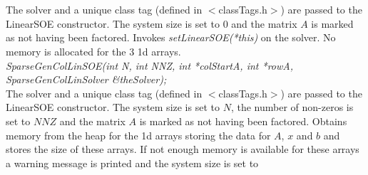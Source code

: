   \\
  \\
The \p solver and a unique class tag (defined in $<$classTags.h$>$)
are passed to the LinearSOE constructor. The system size is set
to $0$ and the matrix $A$ is marked as not having been factored. Invokes
{\em setLinearSOE(*this)} on the \p solver. No memory is
allocated for the 3 1d arrays. \\  


{\em SparseGenColLinSOE(int N, int NNZ, int *colStartA,
int *rowA, SparseGenColLinSolver \&theSolver); }\\
The \p solver and a unique class tag (defined in $<$classTags.h$>$)
are passed to the LinearSOE constructor. The system size is set
to $N$, the number of non-zeros is set to $NNZ$ and the matrix $A$ is
marked as not having been factored. Obtains memory from the heap for
the 1d arrays storing the data for $A$, $x$ and $b$ and stores the
size of these arrays. If not enough memory is available for these
arrays a warning message is printed and the system size is set to
